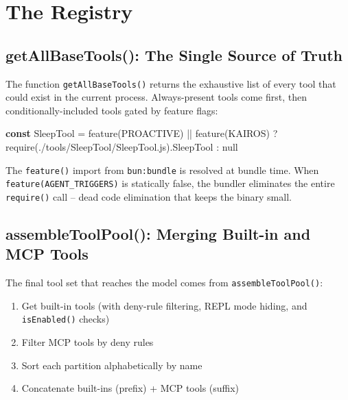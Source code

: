 \documentclass[
  english,
  11pt,
  letterpaper,
]{book}
\newenvironment{Shaded}{\begin{snugshade}}{\end{snugshade}}
\newcommand{\AttributeTok}[1]{\textcolor[rgb]{0.40,0.45,0.13}{#1}}
\newcommand{\DataTypeTok}[1]{\textcolor[rgb]{0.68,0.00,0.00}{#1}}
\newcommand{\FunctionTok}[1]{\textcolor[rgb]{0.28,0.35,0.67}{#1}}
\newcommand{\KeywordTok}[1]{\textcolor[rgb]{0.00,0.23,0.31}{\textbf{#1}}}
\newcommand{\NormalTok}[1]{\textcolor[rgb]{0.00,0.23,0.31}{#1}}
\newcommand{\OperatorTok}[1]{\textcolor[rgb]{0.37,0.37,0.37}{#1}}
\newcommand{\PreprocessorTok}[1]{\textcolor[rgb]{0.68,0.00,0.00}{#1}}
\newcommand{\StringTok}[1]{\textcolor[rgb]{0.13,0.47,0.30}{#1}}
\providecommand{\tightlist}{%
  \setlength{\itemsep}{0pt}\setlength{\parskip}{0pt}}
\begin{document}
\section{The Registry}\label{the-registry}

\subsection{getAllBaseTools(): The Single Source of
Truth}\label{getallbasetools-the-single-source-of-truth}

The function \texttt{getAllBaseTools()} returns the exhaustive list of
every tool that could exist in the current process. Always-present tools
come first, then conditionally-included tools gated by feature flags:

\begin{Shaded}
\begin{Highlighting}[]
\KeywordTok{const}\NormalTok{ SleepTool }\OperatorTok{=} \FunctionTok{feature}\NormalTok{(}\StringTok{\textquotesingle{}PROACTIVE\textquotesingle{}}\NormalTok{) }\OperatorTok{||} \FunctionTok{feature}\NormalTok{(}\StringTok{\textquotesingle{}KAIROS\textquotesingle{}}\NormalTok{)}
  \OperatorTok{?} \PreprocessorTok{require}\NormalTok{(}\StringTok{\textquotesingle{}./tools/SleepTool/SleepTool.js\textquotesingle{}}\NormalTok{)}\OperatorTok{.}\AttributeTok{SleepTool}
  \OperatorTok{:} \DataTypeTok{null}
\end{Highlighting}
\end{Shaded}

The \texttt{feature()} import from \texttt{bun:bundle} is resolved at
bundle time. When
\texttt{feature(\textquotesingle{}AGENT\_TRIGGERS\textquotesingle{})} is
statically false, the bundler eliminates the entire \texttt{require()}
call -- dead code elimination that keeps the binary small.

\subsection{assembleToolPool(): Merging Built-in and MCP
Tools}\label{assembletoolpool-merging-built-in-and-mcp-tools}

The final tool set that reaches the model comes from
\texttt{assembleToolPool()}:

\begin{enumerate}
\def\labelenumi{\arabic{enumi}.}
\tightlist
\item
  Get built-in tools (with deny-rule filtering, REPL mode hiding, and
  \texttt{isEnabled()} checks)
\item
  Filter MCP tools by deny rules
\item
  Sort each partition alphabetically by name
\item
  Concatenate built-ins (prefix) + MCP tools (suffix)
\end{enumerate}
\end{document}
